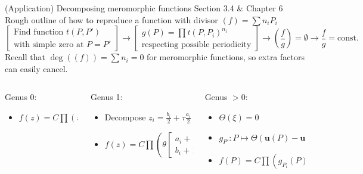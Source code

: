 \documentclass[11pt,aspectratio=169]{beamer}
\begin{document}
\begin{frame}{(Application) Decomposing meromorphic functions}{\tiny \cite{Cha22} Section 3.4 \& \cite{Ber06} Chapter 6}
    Rough outline of how to reproduce a function with divisor $(f) = \sum n_i P_i$
    \[ \begin{bmatrix}\text{Find function }t(P,P') \\ \text{with simple zero at }P=P'\end{bmatrix} \rightarrow \begin{bmatrix} g(P)=\prod t(P,P_i)^{n_i} \\ \text{respecting possible periodicity}\end{bmatrix} \rightarrow \left(\frac{f}{g}\right) = \emptyset \rightarrow \frac{f}{g} = \text{const.} \]
    Recall that $\deg((f)) = \sum n_i = 0$ for meromorphic functions, so extra factors can easily cancel.
    
    \pause{}
    
    \vspace{+1em}
    \begin{columns}[t]
        \begin{column}{0.3\textwidth}
            Genus 0:
            \begin{itemize}
                \item $f(z) = C \prod (z-z_i)^{n_i}$
            \end{itemize}
        \end{column}

        \pause{}

        \begin{column}{0.35\textwidth}
            Genus 1:
            \begin{itemize}
                \item Decompose $z_i = \frac{b_i}{2} + \tau \frac{a_i}{2}$
                \item $f(z) = C \prod \left(\theta\begin{bmatrix}a_i+1 \\ b_i+1\end{bmatrix}(z)\right)^{n_i}$
            \end{itemize}
        \end{column}

        \pause{}

        \begin{column}{0.3\textwidth}
            Genus $>0$:
            \begin{itemize}
                \item $\Theta(\xi) = 0$
                \item $g_{P'} : P \mapsto \Theta(\mathbf{u}(P)-\mathbf{u}(P')+\xi)$
                \item $f(P) = C \prod \left(g_{P_i}(P)\right)^{n_i}$
            \end{itemize}
        \end{column}
    \end{columns}
\end{frame}
\end{document}
